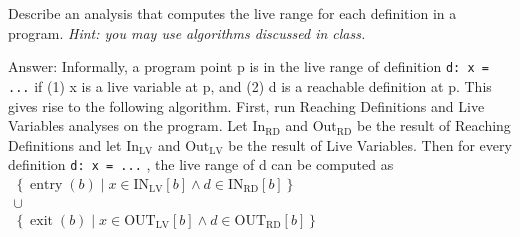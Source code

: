 \begin{problem}
	Describe an analysis that computes the live range for each definition in a program. \emph{Hint: you may use algorithms discussed in class.}
	
	\item Answer: 
	{\color{red}Informally, a program point p is in the live range of definition \texttt{d: x = ...} if (1) x is a live
	variable at p, and (2) d is a reachable definition at p. This gives rise to the following algorithm.
	First, run Reaching Definitions and Live Variables analyses on the program. Let $\mathrm{In}_\mathrm{RD}$ and
	$\mathrm{Out}_\mathrm{RD}$ be the result of Reaching Definitions and let $\mathrm{In}_\mathrm{LV}$ and $\mathrm{Out}_\mathrm{LV}$ be the result of Live
	Variables. Then for every definition \texttt{d: x = ...} , the live range of d can be computed as \\
	$\begin{gathered}\left\{\operatorname{entry}(b) \mid x \in \mathrm{IN}_{\mathrm{LV}}[b] \wedge d \in \mathrm{IN}_{\mathrm{RD}}[b]\right\} \\ \cup \\ \left\{\operatorname{exit}(b) \mid x \in \mathrm{OUT}_{\mathrm{LV}}[b] \wedge d \in \mathrm{OUT}_{\mathrm{RD}}[b]\right\}\end{gathered}$}
	\end{problem}